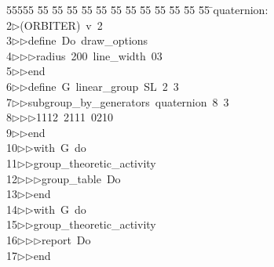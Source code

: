 %
%
\begin{tabbing}
55555 \= 55 \= 55 \= 55 \= 55 \= 55 \= 55 \= 55 \= 55 \= 55 \= 55 \= 55 \= 55 \= \>quaternion:\\[0pt]
2\>$\triangleright$\>(ORBITER)\ v\ 2\ \\[0pt]
3\>$\triangleright$\>$\triangleright$\>define\ Do\ draw\_options\ \\[0pt]
4\>$\triangleright$\>$\triangleright$\>$\triangleright$\>radius\ 200\ line\_width\ 03\ \\[0pt]
5\>$\triangleright$\>$\triangleright$\>end\ \\[0pt]
6\>$\triangleright$\>$\triangleright$\>define\ G\ linear\_group\ SL\ 2\ 3\ \\[0pt]
7\>$\triangleright$\>$\triangleright$\>subgroup\_by\_generators\ quaternion\ 8\ 3\ \\[0pt]
8\>$\triangleright$\>$\triangleright$\>$\triangleright$\>1112\ 2111\ 0210\ \\[0pt]
9\>$\triangleright$\>$\triangleright$\>end\ \\[0pt]
10\>$\triangleright$\>$\triangleright$\>with\ G\ do\ \\[0pt]
11\>$\triangleright$\>$\triangleright$\>group\_theoretic\_activity\ \\[0pt]
12\>$\triangleright$\>$\triangleright$\>$\triangleright$\>group\_table\ Do\ \\[0pt]
13\>$\triangleright$\>$\triangleright$\>end\ \\[0pt]
14\>$\triangleright$\>$\triangleright$\>with\ G\ do\ \\[0pt]
15\>$\triangleright$\>$\triangleright$\>group\_theoretic\_activity\ \\[0pt]
16\>$\triangleright$\>$\triangleright$\>$\triangleright$\>report\ Do\ \\[0pt]
17\>$\triangleright$\>$\triangleright$\>end\ \\[0pt]

\end{tabbing}
